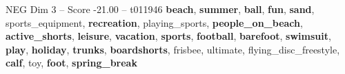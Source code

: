 \begin{textsample}{NEG Dim 3 – Score -21.00 – t011946}  \label{ex:f3_neg_015}
\textbf{beach}, \textbf{summer}, \textbf{ball}, \textbf{fun}, \textbf{sand}, sports\_equipment, \textbf{recreation}, playing\_sports, \textbf{people\_on\_beach}, \textbf{active\_shorts}, \textbf{leisure}, \textbf{vacation}, \textbf{sports}, \textbf{football}, \textbf{barefoot}, \textbf{swimsuit}, \textbf{play}, \textbf{holiday}, \textbf{trunks}, \textbf{boardshorts}, frisbee, ultimate, flying\_disc\_freestyle, \textbf{calf}, toy, \textbf{foot}, \textbf{spring\_break}

\end{textsample}

